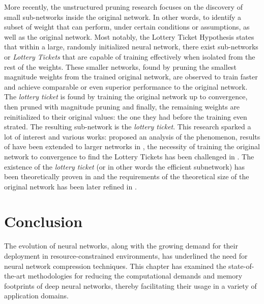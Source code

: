  More recently, the unstructured pruning research focuses on the discovery of
 small sub-networks inside the original network. In other words, to identify a
 subset of weight that can perform, under certain conditions or assumptions, as
 well as the original network. Most notably, the Lottery Ticket Hypothesis
 \cite{DBLP:conf/iclr/FrankleC19} states that within a large, randomly
 initialized neural network, there exist sub-networks or \emph{Lottery Tickets}
 that are capable of training effectively when isolated from the rest of the
 weights. These smaller networks, found by pruning the smallest magnitude
 weights from the trained original network, are observed to train faster and
 achieve comparable or even superior performance to the original network. The
 \emph{lottery ticket} is found by training the original network up to
 convergence, then pruned with magnitude pruning and finally, the remaining
 weights are reinitialized to their original values: the one they had before the
 training even strated. The resulting sub-network is the \emph{lottery ticket}.
 This research sparked a lot of interest and various works:
 \cite{DBLP:conf/nips/ZhouLLY19} proposed an analysis of the phenomenon, results
 of \cite{DBLP:conf/iclr/FrankleC19} have been extended to larger networks in
 \cite{DBLP:journals/corr/abs-1903-01611}, the necessity of training the
 original network to convergence to find the Lottery Tickets has been challenged
 in \cite{DBLP:conf/iclr/LiuSZHD19}. The existence of the \emph{lottery ticket}
 (or in other words the efficient subnetwork) has been theoretically proven in
 \cite{DBLP:conf/icml/MalachYSS20} and the requirements of the theoretical size
 of the original network has been later refined in
 \cite{DBLP:conf/nips/PensiaRNVP20,DBLP:conf/nips/OrseauHR20}.\\


\section{Conclusion}



The evolution of neural networks, along with the growing demand for their
deployment in resource-constrained environments, has underlined the need for
neural network compression techniques. This chapter has examined the
state-of-the-art methodologies for reducing the computational demands and memory
footprints of deep neural networks, thereby facilitating their usage in a
variety of application domains.\\

